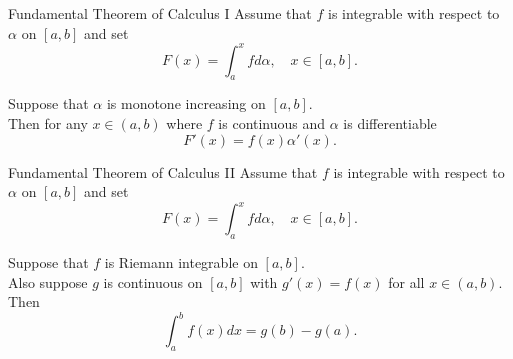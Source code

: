 \documentclass{beamer}
\begin{document}
\begin{frame}{Fundamental Theorem of Calculus I}
Assume that $f$ is integrable with respect to $\alpha$ on $[a,b]$ and set\\
\pause
$$F(x) = \int_a^x fd\alpha,\quad x\in [a,b].$$
\begin{thm}[FTC I]
Suppose that $\alpha$ is monotone increasing on $[a,b]$.\\
Then for any $x\in (a,b)$ where $f$ is continuous and $\alpha$ is differentiable
$$F'(x) = f(x)\alpha'(x).$$
\end{thm}
\end{frame}

\begin{frame}{Fundamental Theorem of Calculus II}
Assume that $f$ is integrable with respect to $\alpha$ on $[a,b]$ and set\\
\pause
$$F(x) = \int_a^x fd\alpha,\quad x\in [a,b].$$
\begin{thm}[FTC II]
Suppose that $f$ is Riemann integrable on $[a,b]$.\\
Also suppose $g$ is continuous on $[a,b]$ with $g'(x) = f(x)$ for all $x\in (a,b)$.\\
Then
$$\int_a^b f(x)dx = g(b)-g(a).$$
\end{thm}
\end{frame}
\end{document}

